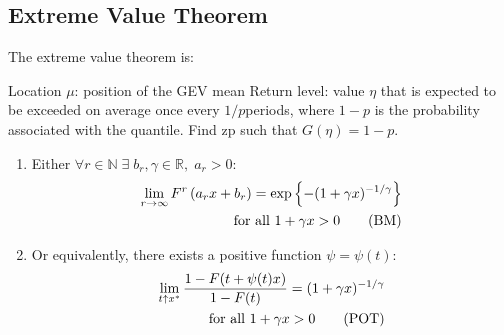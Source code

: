 \subsection{Extreme Value Theorem}
The extreme value theorem is:




Location $\mu$: position of the GEV mean
Return level: value $\eta$ that is expected to
be exceeded on average once every $1/p $periods,
where $1 − p$ is the probability associated with the quantile.
Find zp such that $G(\eta) = 1 -  p$.


\begin{enumerate}
  \item Either $\forall r \in \mathbb{N} \;\exists \;b_r, \gamma\in \mathbb{R},\; a_r>0: $
    \begin{eqnarray}
    \lim _{r \rightarrow \infty} F^{r}\left(a_{r} x+b_{r}\right)=\exp \left\{-(1+\gamma x)^{-1 / \gamma}\right\} \notag \\
     \text { for all } 1+\gamma x>0
    \tag{BM}
    \end{eqnarray}

  \item Or equivalently, there exists a positive function $\psi=\psi (t):$
    \begin{eqnarray}
    \lim _{t \uparrow x^{*}} \frac{1-F(t+\psi(t) x)}{1-F(t)}=(1+\gamma x)^{-1 / \gamma} \notag \\
    \text { for all } 1+\gamma x>0
    \tag{POT}
    \end{eqnarray}
 \end{enumerate}
